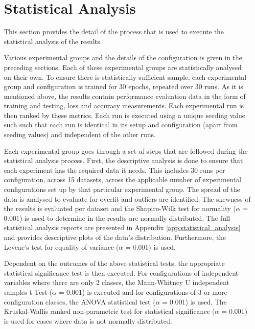 \section{Statistical Analysis}
\label{sec:methodology:statistical_analysis}

This section provides the detail of the process that is used to execute the statistical analysis of the results.

Various experimental groups and the details of the configuration is given in the preceding sections. Each of these experimental groups are statistically analysed on their own. To ensure there is statistically sufficient sample, each experimental group and configuration is trained for 30 epochs, repeated over 30 runs. As it is mentioned above, the results contain performance evaluation data in the form of training and testing, loss and accuracy measurements. Each experimental run is then ranked by these metrics. Each run is executed using a unique seeding value such such that each run is identical in its setup and configuration (apart from seeding values) and independent of the other runs.

Each experimental group goes through a set of steps that are followed during the statistical analysis process. First, the descriptive analysis is done to ensure that each experiment has the required data it needs. This includes 30 runs per configuration, across 15 datasets, across the applicable number of experimental configurations set up by that particular experimental group. The spread of the data is analysed to evaluate for overfit and outliers are identified. The skewness of the results is evaluated per dataset and the Shapiro-Wilk test for normality ($\alpha$ = 0.001) is used to determine in the results are normally distributed. The full statistical analysis reports are presented in Appendix \ref{app:statistical_analysis} and provides descriptive plots of the data's distribution. Furthermore, the Levene's test for equality of variance ($\alpha$ = 0.001) is used.

Dependent on the outcomes of the above statistical tests, the appropriate statistical significance test is then executed. For configurations of independent variables where there are only 2 classes, the Mann-Whitney U independent samples t-Test ($\alpha$ = 0.001) is executed and for configurations of 3 or more configuration classes, the \ac{ANOVA} statistical test ($\alpha$ = 0.001) is used. The Kruskal-Wallis ranked non-parametric test for statistical significance ($\alpha$ = 0.001) is used for cases where data is not normally distributed.

